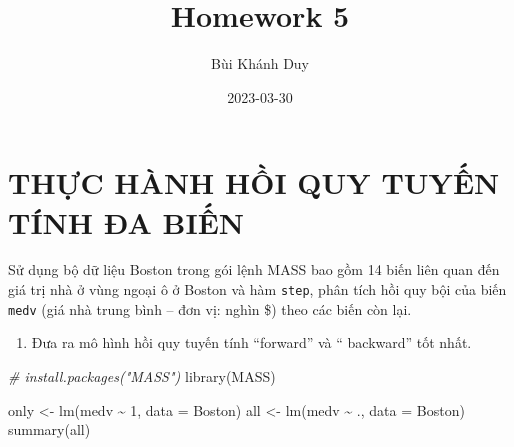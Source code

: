 \documentclass[
]{article}
\title{Homework 5}
\author{Bùi Khánh Duy}
\date{2023-03-30}
\newenvironment{Shaded}{\begin{snugshade}}{\end{snugshade}}
\newcommand{\AttributeTok}[1]{\textcolor[rgb]{0.77,0.63,0.00}{#1}}
\newcommand{\CommentTok}[1]{\textcolor[rgb]{0.56,0.35,0.01}{\textit{#1}}}
\newcommand{\DecValTok}[1]{\textcolor[rgb]{0.00,0.00,0.81}{#1}}
\newcommand{\FunctionTok}[1]{\textcolor[rgb]{0.00,0.00,0.00}{#1}}
\newcommand{\NormalTok}[1]{#1}
\newcommand{\OtherTok}[1]{\textcolor[rgb]{0.56,0.35,0.01}{#1}}
\newcommand{\SpecialCharTok}[1]{\textcolor[rgb]{0.00,0.00,0.00}{#1}}
\providecommand{\tightlist}{%
  \setlength{\itemsep}{0pt}\setlength{\parskip}{0pt}}
\begin{document}
\maketitle

\hypertarget{thux1ef1c-huxe0nh-hux1ed3i-quy-tuyux1ebfn-tuxednh-ux111a-biux1ebfn}{%
\section{THỰC HÀNH HỒI QUY TUYẾN TÍNH ĐA
BIẾN}\label{thux1ef1c-huxe0nh-hux1ed3i-quy-tuyux1ebfn-tuxednh-ux111a-biux1ebfn}}

Sử dụng bộ dữ liệu Boston trong gói lệnh MASS bao gồm 14 biến liên quan
đến giá trị nhà ở vùng ngoại ô ở Boston và hàm \texttt{step}, phân tích
hồi quy bội của biến \texttt{medv} (giá nhà trung bình -- đơn vị: nghìn
\$) theo các biến còn lại.

\begin{enumerate}
\def\labelenumi{\alph{enumi})}
\tightlist
\item
  Đưa ra mô hình hồi quy tuyến tính ``forward'' và `` backward'' tốt
  nhất.
\end{enumerate}

\begin{Shaded}
\begin{Highlighting}[]
  \CommentTok{\# install.packages("MASS")}
  \FunctionTok{library}\NormalTok{(MASS)}
  
\NormalTok{  only }\OtherTok{\textless{}{-}} \FunctionTok{lm}\NormalTok{(medv }\SpecialCharTok{\textasciitilde{}} \DecValTok{1}\NormalTok{, }\AttributeTok{data =}\NormalTok{ Boston)}
\NormalTok{  all }\OtherTok{\textless{}{-}} \FunctionTok{lm}\NormalTok{(medv }\SpecialCharTok{\textasciitilde{}}\NormalTok{ ., }\AttributeTok{data =}\NormalTok{ Boston)}
  \FunctionTok{summary}\NormalTok{(all)}
\end{Highlighting}
\end{Shaded}
\end{document}
